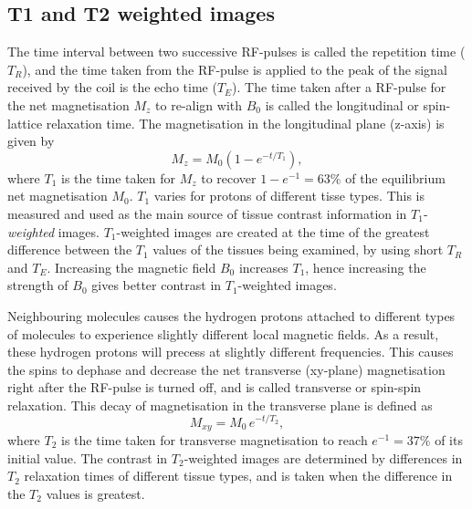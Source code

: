\subsection{T1 and T2 weighted images}
The time interval between two successive RF-pulses is called the repetition time (\(T_R\)), and the time taken from the RF-pulse is applied to the peak of the signal received by the coil is the echo time (\(T_E\)). The time taken after a RF-pulse for the net magnetisation \(M_z\) to re-align with \(B_0\) is called the longitudinal or spin-lattice relaxation time. The magnetisation in the longitudinal plane (z-axis) is given by
\begin{equation}
M_z = M_0(1-e^{-t/T_1}),
\end{equation}
where \(T_1\) is the time taken for \(M_z\) to recover \(1-e^{-1} = 63\%\) of the equilibrium net magnetisation \(M_0\). \(T_1\) varies for protons of different tisse types. This is measured and used as the main source of tissue contrast information in \(T_1\)-\textit{weighted} images. \(T_1\)-weighted images are created at the time of the greatest difference between the \(T_1\) values of the tissues being examined, by using short \(T_R\) and \(T_E\). Increasing the magnetic field \(B_0\) increases \(T_1\), hence increasing the strength of \(B_0\) gives better contrast in \(T_1\)-weighted images.

Neighbouring molecules causes the hydrogen protons attached to different types of molecules to experience slightly different local magnetic fields. As a result, these hydrogen protons will precess at slightly different frequencies. This causes the spins to dephase and decrease the net transverse (xy-plane) magnetisation right after the RF-pulse is turned off, and is called transverse or spin-spin relaxation. This decay of magnetisation in the transverse plane is defined as
\begin{equation}
M_{xy} = M_0 \, e^{-t/T_2},
\end{equation}
where \(T_2\) is the time taken for transverse magnetisation to reach \(e^{-1} = 37\%\) of its initial value. The contrast in \(T_2\)-weighted images are determined by differences in \(T_2\) relaxation times of different tissue types, and is taken when the difference in the \(T_2\) values is greatest.

